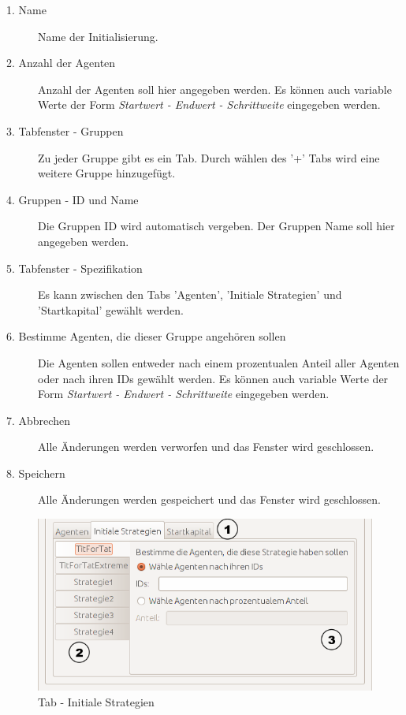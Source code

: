 \begin{description}

\item[1. Name] Name der Initialisierung.

\item[2. Anzahl der Agenten] Anzahl der Agenten soll hier angegeben werden. Es können auch variable Werte der Form \textit{Startwert - Endwert - Schrittweite} eingegeben werden.

\item[3. Tabfenster - Gruppen] Zu jeder Gruppe gibt es ein Tab. Durch wählen des '+' Tabs wird eine weitere Gruppe hinzugefügt.

\item[4. Gruppen - ID und Name] Die Gruppen ID wird automatisch vergeben. Der Gruppen Name soll hier angegeben werden.

\item[5. Tabfenster - Spezifikation] Es kann zwischen den Tabs 'Agenten', 'Initiale Strategien' und 'Startkapital' gewählt werden.   

\item[6. Bestimme Agenten, die dieser Gruppe angehören sollen] Die Agenten sollen entweder nach einem prozentualen Anteil aller Agenten oder nach ihren IDs gewählt werden. Es können auch variable Werte der Form \textit{Startwert - Endwert - Schrittweite} eingegeben werden.

\item[7. Abbrechen] Alle Änderungen werden verworfen und das Fenster wird geschlossen.

\item[8. Speichern] Alle Änderungen werden gespeichert und das Fenster wird geschlossen.

\end{description}
\pagebreak



\begin{figure}[!hp] 
  \centering
     \includegraphics[width=1.0\textwidth]{GUI_Entwurf/InitialisierungBearbeiten2.png}
  \caption{Tab - Initiale Strategien}
  \label{fig:Bild1}
\end{figure}

